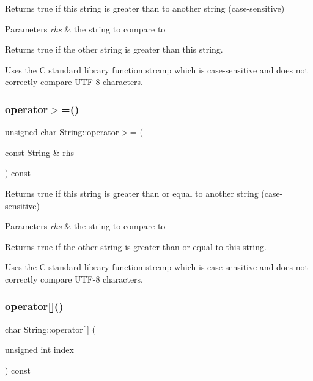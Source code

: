 Returns true if this string is greater than to another string (case-\/sensitive) 


\begin{DoxyParams}{Parameters}
{\em rhs} & the string to compare to\\
\hline
\end{DoxyParams}
\begin{DoxyReturn}{Returns}
true if the other string is greater than this string.
\end{DoxyReturn}
Uses the C standard library function strcmp which is case-\/sensitive and does not correctly compare U\+T\+F-\/8 characters. \mbox{\label{class_string_ad55ec344221bba8a7447226bde7b00dc}} 
\subsubsection{\texorpdfstring{operator$>$=()}{operator>=()}}
{\footnotesize\ttfamily unsigned char String\+::operator$>$= (\begin{DoxyParamCaption}\item[{const \hyperlink{class_string}{String} \&}]{rhs }\end{DoxyParamCaption}) const}



Returns true if this string is greater than or equal to another string (case-\/sensitive) 


\begin{DoxyParams}{Parameters}
{\em rhs} & the string to compare to\\
\hline
\end{DoxyParams}
\begin{DoxyReturn}{Returns}
true if the other string is greater than or equal to this string.
\end{DoxyReturn}
Uses the C standard library function strcmp which is case-\/sensitive and does not correctly compare U\+T\+F-\/8 characters. \mbox{\label{class_string_a277d6b29f7f152a03c81700b12e43e55}} 
\subsubsection{\texorpdfstring{operator[]()}{operator[]()}\hspace{0.1cm}{\footnotesize\ttfamily [1/2]}}
{\footnotesize\ttfamily char String\+::operator\mbox{[}$\,$\mbox{]} (\begin{DoxyParamCaption}\item[{unsigned int}]{index }\end{DoxyParamCaption}) const}



